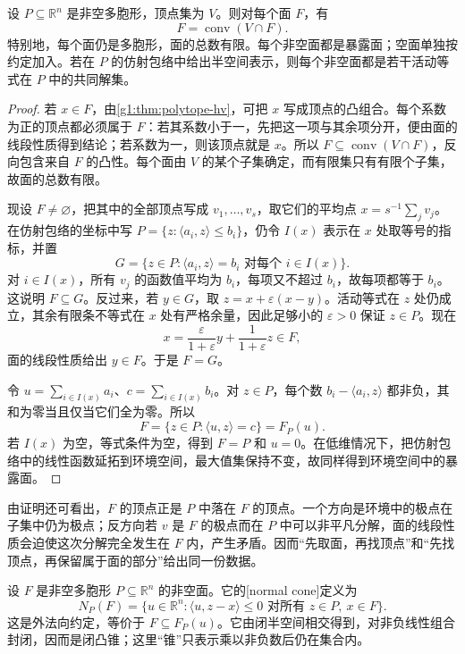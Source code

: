 \begin{theorem}
	\label{g1:thm:polytope-faces}
	设 \(P\subseteq\mathbb R^n\) 是非空多胞形，顶点集为 \(V\)。则对每个面 \(F\)，有
	\[
		F=\operatorname{conv}(V\cap F).
	\]
	特别地，每个面仍是多胞形，面的总数有限。每个非空面都是暴露面；空面单独按约定加入。若在 \(P\) 的仿射包络中给出半空间表示，则每个非空面都是若干活动等式在 \(P\) 中的共同解集。
\end{theorem}

\begin{proof}
	若 \(x\in F\)，由\cref{g1:thm:polytope-hv}，可把 \(x\) 写成顶点的凸组合。每个系数为正的顶点都必须属于 \(F\)：若其系数小于一，先把这一项与其余项分开，便由面的线段性质得到结论；若系数为一，则该顶点就是 \(x\)。所以 \(F\subseteq\operatorname{conv}(V\cap F)\)，反向包含来自 \(F\) 的凸性。每个面由 \(V\) 的某个子集确定，而有限集只有有限个子集，故面的总数有限。

	现设 \(F\ne\varnothing\)，把其中的全部顶点写成 \(v_1,\ldots,v_s\)，取它们的平均点 \(x=s^{-1}\sum_jv_j\)。在仿射包络的坐标中写 \(P=\{z:\langle a_i,z\rangle\le b_i\}\)，仍令 \(I(x)\) 表示在 \(x\) 处取等号的指标，并置
	\[
		G=\{z\in P:\langle a_i,z\rangle=b_i\text{ 对每个 }i\in I(x)\}.
	\]
	对 \(i\in I(x)\)，所有 \(v_j\) 的函数值平均为 \(b_i\)，每项又不超过 \(b_i\)，故每项都等于 \(b_i\)。这说明 \(F\subseteq G\)。反过来，若 \(y\in G\)，取 \(z=x+\varepsilon(x-y)\)。活动等式在 \(z\) 处仍成立，其余有限条不等式在 \(x\) 处有严格余量，因此足够小的 \(\varepsilon>0\) 保证 \(z\in P\)。现在
	\[
		x=\frac{\varepsilon}{1+\varepsilon}y+\frac1{1+\varepsilon}z\in F,
	\]
	面的线段性质给出 \(y\in F\)。于是 \(F=G\)。

	令 \(u=\sum_{i\in I(x)}a_i\)、\(c=\sum_{i\in I(x)}b_i\)。对 \(z\in P\)，每个数 \(b_i-\langle a_i,z\rangle\) 都非负，其和为零当且仅当它们全为零。所以
	\[
		F=\{z\in P:\langle u,z\rangle=c\}=F_P(u).
	\]
	若 \(I(x)\) 为空，等式条件为空，得到 \(F=P\) 和 \(u=0\)。在低维情况下，把仿射包络中的线性函数延拓到环境空间，最大值集保持不变，故同样得到环境空间中的暴露面。
\end{proof}

由证明还可看出，\(F\) 的顶点正是 \(P\) 中落在 \(F\) 的顶点。一个方向是环境中的极点在子集中仍为极点；反方向若 \(v\) 是 \(F\) 的极点而在 \(P\) 中可以非平凡分解，面的线段性质会迫使这次分解完全发生在 \(F\) 内，产生矛盾。因而“先取面，再找顶点”和“先找顶点，再保留属于面的部分”给出同一份数据。

\begin{definition}
	\label{g1:def:normal-cone}
	设 \(F\) 是非空多胞形 \(P\subseteq\mathbb R^n\) 的非空面。它的[normal cone]定义为
	\[
		N_P(F)=\{u\in\mathbb R^n:\langle u,z-x\rangle\le0\text{ 对所有 }z\in P,\ x\in F\}.
	\]
	这是外法向约定，等价于 \(F\subseteq F_P(u)\)。它由闭半空间相交得到，对非负线性组合封闭，因而是闭凸锥；这里“锥”只表示乘以非负数后仍在集合内。
\end{definition}

